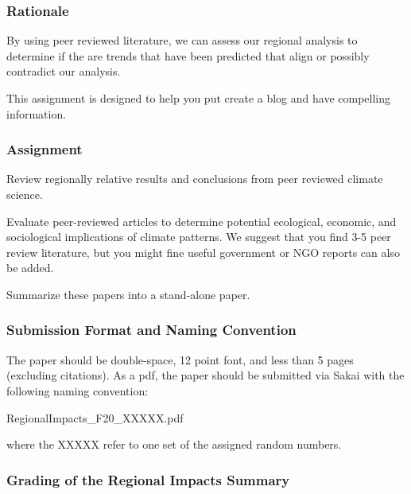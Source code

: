 
\subsubsection{Rationale}

By using peer reviewed literature, we can assess our regional analysis to determine if the are trends that have been predicted that align or possibly contradict our analysis. 

This assignment is designed to help you put create a blog and have compelling information. 

\subsubsection{Assignment}

Review regionally relative results and conclusions from peer reviewed climate science. %


Evaluate peer-reviewed articles to determine potential ecological, economic, and sociological implications of climate patterns. We suggest that you find 3-5 peer review literature, but you might fine useful government or NGO reports can also be added.

Summarize these papers into a stand-alone paper. 

\subsubsection{Submission Format and Naming Convention}

The paper should be double-space, 12 point font, and less than 5 pages (excluding citations). As a pdf, the paper should be submitted via Sakai with the following naming convention:

\begin{center}
RegionalImpacts\_F20\_XXXXX.pdf
\end{center}

\medskip \noindent where the XXXXX refer to one set of the assigned random numbers. 

\subsubsection{Grading of the Regional Impacts Summary}

